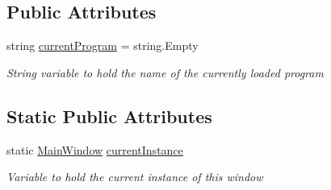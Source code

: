 \subsection*{Public Attributes}
\begin{DoxyCompactItemize}
\item 
string \hyperlink{class_c_p_u___o_s___simulator_1_1_main_window_a91f063d9cf776004dc74e719ef942907}{current\+Program} = string.\+Empty
\begin{DoxyCompactList}\small\item\em String variable to hold the name of the currently loaded program \end{DoxyCompactList}\end{DoxyCompactItemize}
\subsection*{Static Public Attributes}
\begin{DoxyCompactItemize}
\item 
static \hyperlink{class_c_p_u___o_s___simulator_1_1_main_window}{Main\+Window} \hyperlink{class_c_p_u___o_s___simulator_1_1_main_window_a1280266cc57403a91f08a8350dee05cc}{current\+Instance}
\begin{DoxyCompactList}\small\item\em Variable to hold the current instance of this window \end{DoxyCompactList}\end{DoxyCompactItemize}
